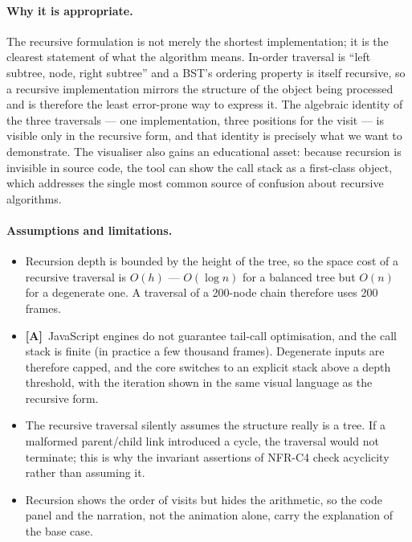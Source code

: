 \documentclass[11pt,a4paper]{article}
\newcommand{\A}{\textcolor{asmc}{\textbf{[A]}}}     %
\begin{document}
\paragraph{Why it is appropriate.} The recursive formulation is not merely the shortest
implementation; it is the clearest statement of what the algorithm means. In-order traversal
is ``left subtree, node, right subtree'' and a BST's ordering property is itself recursive,
so a recursive implementation mirrors the structure of the object being processed and is
therefore the least error-prone way to express it. The algebraic identity of the three
traversals --- one implementation, three positions for the visit --- is visible only in the
recursive form, and that identity is precisely what we want to demonstrate. The visualiser
also gains an educational asset: because recursion is invisible in source code, the tool can
show the call stack as a first-class object, which addresses the single most common source of
confusion about recursive algorithms.

\paragraph{Assumptions and limitations.}
\begin{itemize}[leftmargin=1.6em,itemsep=2pt]
  \item Recursion depth is bounded by the height of the tree, so the space cost of a
        recursive traversal is $O(h)$ --- $O(\log n)$ for a balanced tree but $O(n)$ for a
        degenerate one. A traversal of a 200-node chain therefore uses 200 frames.
  \item \A\ JavaScript engines do not guarantee tail-call optimisation, and the call stack is
        finite (in practice a few thousand frames). Degenerate inputs are therefore capped,
        and the core switches to an explicit stack above a depth threshold, with the
        iteration shown in the same visual language as the recursive form.
  \item The recursive traversal silently assumes the structure really is a tree. If a
        malformed parent/child link introduced a cycle, the traversal would not terminate;
        this is why the invariant assertions of NFR-C4 check acyclicity rather than assuming
        it.
  \item Recursion shows the order of visits but hides the arithmetic, so the code panel and
        the narration, not the animation alone, carry the explanation of the base case.
\end{itemize}
\end{document}
